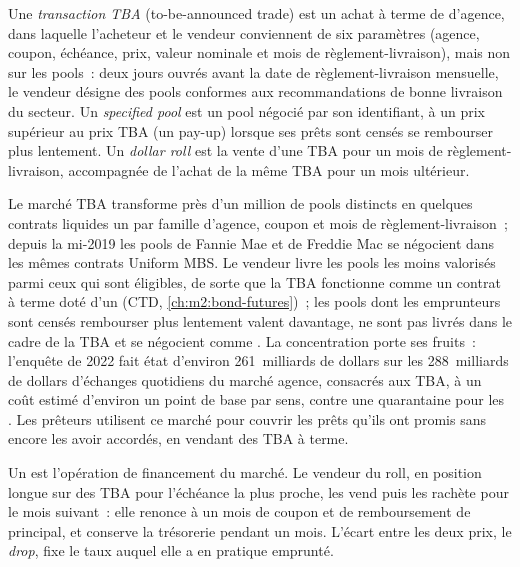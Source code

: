 \begin{definition}\label{def:m2:mortgages-and-agencies:tba}
Une \emph{transaction TBA} (to-be-announced trade) est un achat à terme de  d'agence,
dans laquelle l'acheteur et le vendeur conviennent de six
paramètres (agence, coupon, échéance, prix, valeur nominale et mois de règlement-livraison),
mais non sur les pools~: deux jours ouvrés avant la date de règlement-livraison mensuelle, le
vendeur désigne des pools conformes aux recommandations de bonne livraison du secteur. Un
\emph{specified pool} est un pool négocié par son
identifiant, à un prix supérieur au prix TBA (un pay-up) lorsque ses prêts sont
censés se rembourser plus lentement. Un \emph{dollar roll} est la
vente d'une TBA pour un mois de règlement-livraison, accompagnée de l'achat de la même
TBA pour un mois ultérieur.
\end{definition}

Le marché TBA transforme près d'un million de pools distincts en quelques contrats liquides
un par famille d'agence, coupon et mois de règlement-livraison~; depuis la mi-2019
les pools de Fannie Mae et de Freddie Mac se négocient dans les mêmes contrats Uniform MBS. Le
vendeur livre les pools les moins valorisés parmi ceux qui sont éligibles, de sorte que la TBA fonctionne comme
un contrat à terme doté d'un  (CTD, \cref{ch:m2:bond-futures})~; les pools
dont les emprunteurs sont censés rembourser plus lentement valent davantage, ne sont pas
livrés dans le cadre de la TBA et se négocient comme . La concentration porte ses fruits~: l'enquête de 2022 fait état d'environ 261~milliards
de dollars sur les 288~milliards de dollars d'échanges quotidiens du marché agence, consacrés aux TBA, à un
coût estimé d'environ un point de base par sens, contre une quarantaine pour
les . Les prêteurs utilisent ce marché pour couvrir les prêts qu'ils ont promis
sans encore les avoir accordés, en vendant des TBA à terme.

Un  est l'opération de financement du marché. Le vendeur du roll, en position longue sur des TBA pour
l'échéance la plus proche, les vend puis les rachète pour le mois suivant~: elle renonce à
un mois de coupon et de remboursement de principal, et conserve la trésorerie pendant un mois.
L'écart entre les deux prix, le \emph{drop}, fixe le taux auquel
elle a en pratique emprunté.

